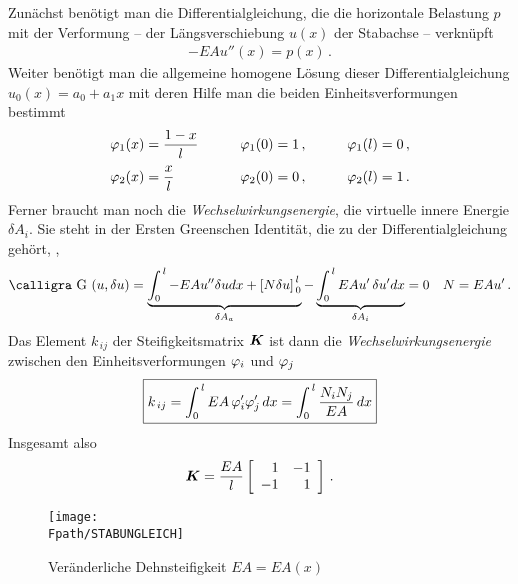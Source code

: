 Zun\"{a}chst ben\"{o}tigt man die Differentialgleichung, die die horizontale Belastung $p$ mit der Verformung -- der L\"{a}ngsverschiebung $u(x)$ der Stabachse -- verkn\"{u}pft
\begin{align}
 -EA u''(x) = p(x)\,.
\end{align}
Weiter ben\"{o}tigt man die allgemeine homogene L\"{o}sung dieser Differentialgleichung
$ u_0(x) = a_0 + a_1 x $
mit deren Hilfe man die beiden Einheitsverformungen bestimmt
\begin{align}\label{Eq15}
\barr{l l l}
\Np_1(x) = {\displaystyle \frac{1 - x}{l}} \qquad &\Np_1(0) = 1\,, \qquad &\Np_1(l) = 0\,, \\[0.3cm]
\Np_2(x) = {\displaystyle \frac{x}{l}}  \qquad &\Np_2(0) = 0\,, \qquad &\Np_2(l) = 1\,.
\earr
\end{align}
Ferner braucht man noch die {\em Wechselwirkungsenergie}, die virtuelle innere Energie $\delta A_i$. Sie steht in der Ersten Greenschen Identit\"{a}t, die zu der Differentialgleichung geh\"{o}rt, \cite{HaJa2},
\begin{align}
\text{\normalfont\calligra G\,\,}(u, \delta u) = \underbrace{\int_0^{\,l} -EA u'' \delta u dx + \left [N \delta u\right
]_{\,0}^{\,l}}_{\delta A_a} - \underbrace{\int_0^{\,l} EA u'\, \delta u' dx}_{\delta A_i} = 0 \quad N
= EA u'\,.
\end{align}
Das Element $k_{\,ij}$ der Steifigkeitsmatrix $\vek K$ ist dann die {\em Wechselwirkungsenergie} zwischen den Einheitsverformungen
$\Np_i$ und $\Np_j$\\
\begin{align}
\boxed{
k_{\,ij} = \int_0^{\,l} EA\, \Np_i' \Np_j' \,dx = \int_0^{\,l} \frac{N_i N_j}{EA}\, dx
}
\end{align}
Insgesamt also
\begin{align}
\vek K = \frac{EA}{l} \left [\barr {r r} 1 & -1 \\ -1 & 1 \earr \right ] \,.
\end{align}

\begin{figure}[tbp] \centering
\if {} \sidecaption \fi
\texttt{[image: \\Fpath/STABUNGLEICH]}
\caption{Ver\"{a}nderliche Dehnsteifigkeit $EA = EA(x)$}
\label{Stabungleich}%
\end{figure}%

